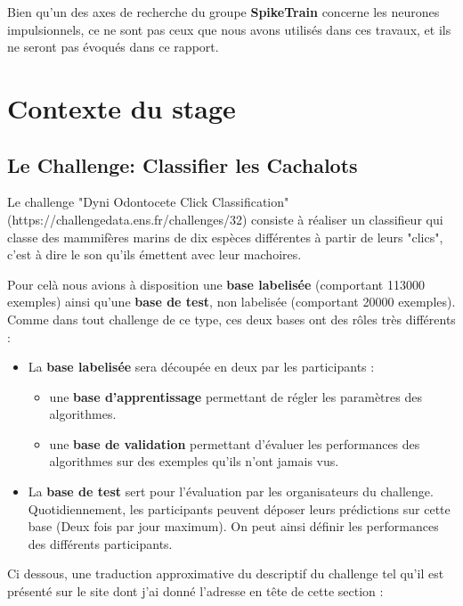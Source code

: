 Bien qu'un des axes de recherche du groupe \textbf{SpikeTrain} concerne les
neurones impulsionnels, ce ne sont pas ceux que nous avons utilisés dans ces
travaux, et ils ne seront pas évoqués dans ce rapport.


\hypertarget{Contexte}{%
\section{Contexte du stage}\label{Contexte}}

\hypertarget{Le-Challenge}{%
\subsection{Le Challenge: Classifier les Cachalots}\label{Le-Challenge}}

Le challenge "Dyni Odontocete Click Classification"
(https://challengedata.ens.fr/challenges/32) consiste à réaliser un classifieur qui classe des mammifères marins de dix espèces différentes à partir de leurs "clics", c'est à dire le son qu'ils émettent avec leur machoires.

Pour celà nous avions à disposition une \textbf{base labelisée} (comportant 113000 exemples) ainsi qu'une \textbf{base de test}, non labelisée (comportant 20000 exemples). Comme dans tout challenge de ce type, ces deux bases ont des rôles
très différents :

\begin{itemize}
  \item La \textbf{base labelisée} sera découpée en deux par les participants :
    \begin{itemize}
      \item une \textbf{base d'apprentissage} permettant de régler les
      paramètres des algorithmes.
      \item une \textbf{base de validation} permettant d'évaluer les
      performances des algorithmes sur des exemples qu'ils n'ont jamais vus.
    \end{itemize}
  \item La \textbf{base de test} sert pour l'évaluation par les organisateurs du
  challenge. Quotidiennement, les participants peuvent déposer leurs prédictions
  sur cette base (Deux fois par jour maximum). On peut ainsi définir les
  performances des différents participants.
\end{itemize}

Ci dessous, une traduction approximative du descriptif du challenge tel qu'il
est présenté sur le site dont j'ai donné l'adresse en tête de cette section :

